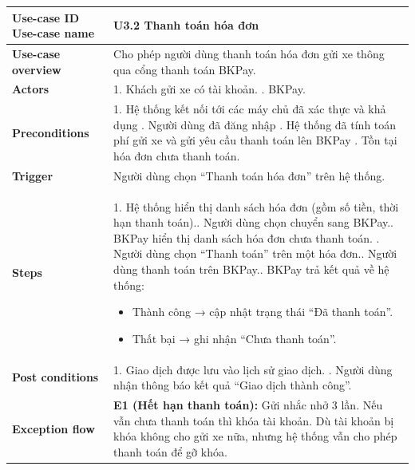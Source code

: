 \begin{tabularx}{\textwidth}{|>{\raggedright\arraybackslash}p{4cm}|X|}
\hline
\textbf{Use-case ID} \newline \textbf{Use-case name} & U3.2 \newline \textbf{Thanh toán hóa đơn} \\ \hline
\textbf{Use-case overview} & Cho phép người dùng thanh toán hóa đơn gửi xe thông qua cổng thanh toán BKPay. \\ \hline
\textbf{Actors} & 1. Khách gửi xe có tài khoản. \newline 2. BKPay. \\ \hline
\textbf{Preconditions} & 
1. Hệ thống kết nối tới các máy chủ đã xác thực và khả dụng \newline
2. Người dùng đã đăng nhập \newline
3. Hệ thống đã tính toán phí gửi xe và gửi yêu cầu thanh toán lên BKPay \newline
4. Tồn tại hóa đơn chưa thanh toán. \\ \hline
\textbf{Trigger} & Người dùng chọn “Thanh toán hóa đơn” trên hệ thống. \\ \hline
\textbf{Steps} & 
1. Hệ thống hiển thị danh sách hóa đơn (gồm số tiền, thời hạn thanh toán).\newline
2. Người dùng chọn chuyển sang BKPay.\newline
3. BKPay hiển thị danh sách hóa đơn chưa thanh toán. \newline
4. Người dùng chọn ``Thanh toán'' trên một hóa đơn.\newline
5. Người dùng thanh toán trên BKPay.\newline
6. BKPay trả kết quả về hệ thống: 
\vspace*{-10pt}
    \begin{itemize}
        \item Thành công → cập nhật trạng thái “Đã thanh toán”.
        \vspace*{-10pt}
        \item Thất bại → ghi nhận “Chưa thanh toán”. 
    \end{itemize}
\vspace*{-10pt}
\\ \hline
\textbf{Post conditions} &  
                            1. Giao dịch được lưu vào lịch sử giao dịch. \newline
                            2. Người dùng nhận thông báo kết quả ``Giao dịch thành công''.
 \\ \hline
\textbf{Exception flow} & 
\textbf{E1 (Hết hạn thanh toán):} Gửi nhắc nhở 3 lần. Nếu vẫn chưa thanh toán thì khóa tài khoản. Dù tài khoản bị khóa không cho gửi xe nữa, nhưng hệ thống vẫn cho phép thanh toán để gỡ khóa.\\ \hline
\end{tabularx}

